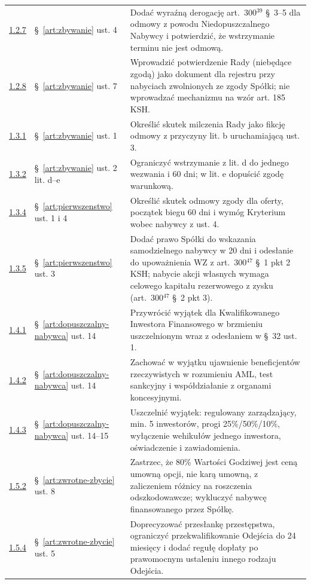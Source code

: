 \documentclass[12pt,a4paper]{report}
\begin{document}
\begin{longtable}{@{}p{1.3cm} p{3.3cm} p{9.6cm}@{}}
\hyperref[memo:1.2.7]{1.2.7} & §~\ref{art:zbywanie} ust. 4 & Dodać wyraźną derogację art.~300$^{39}$ §~3--5 dla odmowy z powodu Niedopuszczalnego Nabywcy i potwierdzić, że wstrzymanie terminu nie jest odmową. \\
\hyperref[memo:1.2.8]{1.2.8} & §~\ref{art:zbywanie} ust. 7 & Wprowadzić potwierdzenie Rady (niebędące zgodą) jako dokument dla rejestru przy nabyciach zwolnionych ze zgody Spółki; nie wprowadzać mechanizmu na wzór art. 185 KSH. \\
\hyperref[memo:1.3.1]{1.3.1} & §~\ref{art:zbywanie} ust. 1 & Określić skutek milczenia Rady jako fikcję odmowy z przyczyny lit. b uruchamiającą ust. 3. \\
\hyperref[memo:1.3.2]{1.3.2} & §~\ref{art:zbywanie} ust. 2 lit. d--e & Ograniczyć wstrzymanie z lit. d do jednego wezwania i 60 dni; w lit. e dopuścić zgodę warunkową. \\
\hyperref[memo:1.3.4]{1.3.4} & §~\ref{art:pierwszenstwo} ust. 1 i 4 & Określić skutek odmowy zgody dla oferty, początek biegu 60 dni i wymóg Kryterium wobec nabywcy z ust. 4. \\
\hyperref[memo:1.3.5]{1.3.5} & §~\ref{art:pierwszenstwo} ust. 3 & Dodać prawo Spółki do wskazania samodzielnego nabywcy w 20 dni i odesłanie do upoważnienia WZ z art.~300$^{47}$ §~1 pkt 2 KSH; nabycie akcji własnych wymaga celowego kapitału rezerwowego z zysku (art.~300$^{47}$ §~2 pkt 3). \\
\hyperref[memo:1.4.1]{1.4.1} & §~\ref{art:dopuszczalny-nabywca} ust. 14 & Przywrócić wyjątek dla Kwalifikowanego Inwestora Finansowego w brzmieniu uszczelnionym wraz z odesłaniem w §~32 ust. 1. \\
\hyperref[memo:1.4.2]{1.4.2} & §~\ref{art:dopuszczalny-nabywca} ust. 14 & Zachować w wyjątku ujawnienie beneficjentów rzeczywistych w rozumieniu AML, test sankcyjny i współdziałanie z organami koncesyjnymi. \\
\hyperref[memo:1.4.3]{1.4.3} & §~\ref{art:dopuszczalny-nabywca} ust. 14--15 & Uszczelnić wyjątek: regulowany zarządzający, min. 5 inwestorów, progi 25\%/50\%/10\%, wyłączenie wehikułów jednego inwestora, oświadczenie i zawiadomienia. \\
\hyperref[memo:1.5.2]{1.5.2} & §~\ref{art:zwrotne-zbycie} ust. 8 & Zastrzec, że 80\% Wartości Godziwej jest ceną umowną opcji, nie karą umowną, z zaliczeniem różnicy na roszczenia odszkodowawcze; wykluczyć nabywcę finansowanego przez Spółkę. \\
\hyperref[memo:1.5.4]{1.5.4} & §~\ref{art:zwrotne-zbycie} ust. 5 & Doprecyzować przesłankę przestępstwa, ograniczyć przekwalifikowanie Odejścia do 24 miesięcy i dodać regułę dopłaty po prawomocnym ustaleniu innego rodzaju Odejścia. \\

\end{longtable}
\end{document}
